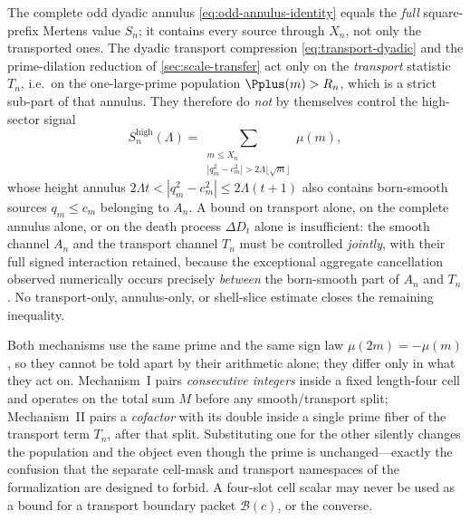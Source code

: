 \begin{caution}
\label{warn:transport-partial}
The complete odd dyadic annulus \cref{eq:odd-annulus-identity} equals the \emph{full} square-prefix Mertens value $S_n$; it contains every source through $X_n$, not only the transported ones.  The dyadic transport compression \cref{eq:transport-dyadic} and the prime-dilation reduction of \cref{sec:scale-transfer} act only on the \emph{transport} statistic $T_n$, i.e.\ on the one-large-prime population $\Pplus(m)>R_n$, which is a strict sub-part of that annulus.  They therefore do \emph{not} by themselves control the high-sector signal
\[
 S_n^{\mathrm{high}}(\Lambda)
 =\!\!\sum_{\substack{m\le X_n\\ |q_m^2-c_m^2|>2\Lambda\lfloor\sqrt m\rfloor}}\!\!\mu(m),
\]
whose height annulus $2\Lambda t<|q_m^2-c_m^2|\le2\Lambda(t+1)$ also contains born-smooth sources $q_m\le c_m$ belonging to $A_n$.  A bound on transport alone, on the complete annulus alone, or on the death process $\Delta D_t$ alone is insufficient: the smooth channel $A_n$ and the transport channel $T_n$ must be controlled \emph{jointly}, with their full signed interaction retained, because the exceptional aggregate cancellation observed numerically occurs precisely \emph{between} the born-smooth part of $A_n$ and $T_n$.  No transport-only, annulus-only, or shell-slice estimate closes the remaining inequality.
\end{caution}

\begin{remark}
\label{rem:no-merge}
Both mechanisms use the same prime and the same sign law $\mu(2m)=-\mu(m)$, so they cannot be told apart by their arithmetic alone; they differ only in what they act on.  Mechanism~I pairs \emph{consecutive integers} inside a fixed length-four cell and operates on the total sum $M$ before any smooth/transport split; Mechanism~II pairs a \emph{cofactor} with its double inside a single prime fiber of the transport term $T_n$, after that split.  Substituting one for the other silently changes the population and the object even though the prime is unchanged---exactly the confusion that the separate cell-mask and transport namespaces of the formalization are designed to forbid.  A four-slot cell scalar may never be used as a bound for a transport boundary packet $\mathcal B(c)$, or the converse.
\end{remark}


